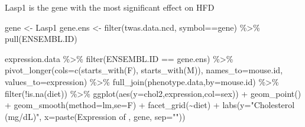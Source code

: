 \documentclass[
]{article}
\newenvironment{Shaded}{\begin{snugshade}}{\end{snugshade}}
\newcommand{\AttributeTok}[1]{\textcolor[rgb]{0.77,0.63,0.00}{#1}}
\newcommand{\FunctionTok}[1]{\textcolor[rgb]{0.00,0.00,0.00}{#1}}
\newcommand{\NormalTok}[1]{#1}
\newcommand{\OtherTok}[1]{\textcolor[rgb]{0.56,0.35,0.01}{#1}}
\newcommand{\SpecialCharTok}[1]{\textcolor[rgb]{0.00,0.00,0.00}{#1}}
\newcommand{\StringTok}[1]{\textcolor[rgb]{0.31,0.60,0.02}{#1}}
\begin{document}
Lasp1 is the gene with the most significant effect on HFD

\begin{Shaded}
\begin{Highlighting}[]
\NormalTok{gene }\OtherTok{\textless{}{-}} \StringTok{\textquotesingle{}Lasp1\textquotesingle{}}
\NormalTok{gene.ens }\OtherTok{\textless{}{-}} \FunctionTok{filter}\NormalTok{(twas.data.ncd, symbol}\SpecialCharTok{==}\NormalTok{gene) }\SpecialCharTok{\%\textgreater{}\%} \FunctionTok{pull}\NormalTok{(ENSEMBL.ID)}

\NormalTok{expression.data }\SpecialCharTok{\%\textgreater{}\%}
  \FunctionTok{filter}\NormalTok{(ENSEMBL.ID }\SpecialCharTok{==}\NormalTok{ gene.ens) }\SpecialCharTok{\%\textgreater{}\%}
  \FunctionTok{pivot\_longer}\NormalTok{(}\AttributeTok{cols=}\FunctionTok{c}\NormalTok{(}\FunctionTok{starts\_with}\NormalTok{(}\StringTok{\textquotesingle{}F\textquotesingle{}}\NormalTok{),}
                      \FunctionTok{starts\_with}\NormalTok{(}\StringTok{\textquotesingle{}M\textquotesingle{}}\NormalTok{)),}
               \AttributeTok{names\_to=}\StringTok{\textquotesingle{}mouse.id\textquotesingle{}}\NormalTok{,}
               \AttributeTok{values\_to=}\StringTok{\textquotesingle{}expression\textquotesingle{}}\NormalTok{) }\SpecialCharTok{\%\textgreater{}\%}
  \FunctionTok{full\_join}\NormalTok{(phenotype.data,}\AttributeTok{by=}\StringTok{\textquotesingle{}mouse.id\textquotesingle{}}\NormalTok{) }\SpecialCharTok{\%\textgreater{}\%}
  \FunctionTok{filter}\NormalTok{(}\SpecialCharTok{!}\FunctionTok{is.na}\NormalTok{(diet)) }\SpecialCharTok{\%\textgreater{}\%}
  \FunctionTok{ggplot}\NormalTok{(}\FunctionTok{aes}\NormalTok{(}\AttributeTok{y=}\NormalTok{chol2,expression,}\AttributeTok{col=}\NormalTok{sex)) }\SpecialCharTok{+}
  \FunctionTok{geom\_point}\NormalTok{() }\SpecialCharTok{+}
  \FunctionTok{geom\_smooth}\NormalTok{(}\AttributeTok{method=}\StringTok{\textquotesingle{}lm\textquotesingle{}}\NormalTok{,}\AttributeTok{se=}\NormalTok{F) }\SpecialCharTok{+}
  \FunctionTok{facet\_grid}\NormalTok{(}\SpecialCharTok{\textasciitilde{}}\NormalTok{diet) }\SpecialCharTok{+}
  \FunctionTok{labs}\NormalTok{(}\AttributeTok{y=}\StringTok{"Cholesterol (mg/dL)"}\NormalTok{,}
       \AttributeTok{x=}\FunctionTok{paste}\NormalTok{(}\StringTok{\textquotesingle{}Expression of \textquotesingle{}}\NormalTok{, gene, }\AttributeTok{sep=}\StringTok{""}\NormalTok{))}
\end{Highlighting}
\end{Shaded}
\end{document}

